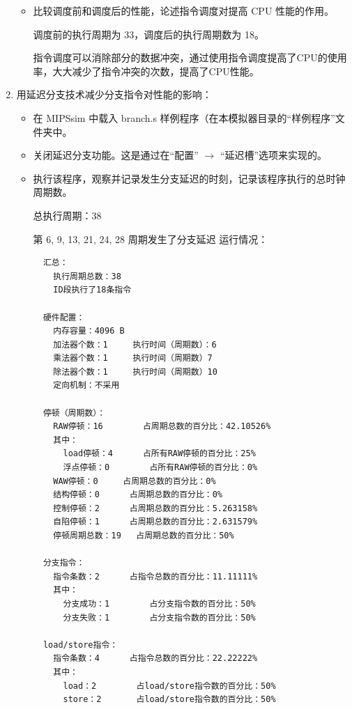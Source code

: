 \documentclass[blue,normal,cn]{elegantnote}
\begin{document}
\begin{enumerate}[wide=0pt, listparindent=2em, parsep=0pt]
\begin{itemize}[leftmargin=3em, listparindent=2em, parsep=0pt]
          \item 比较调度前和调度后的性能，论述指令调度对提高 CPU 性能的作用。

                \textcolor{ans}{调度前的执行周期为 33，调度后的执行周期数为 18。}

                \textcolor{ans}{指令调度可以消除部分的数据冲突，通过使用指令调度提高了CPU的使用率，大大减少了指令冲突的次数，提高了CPU性能。}


        \end{itemize}

  \item 用延迟分支技术减少分支指令对性能的影响：

        \begin{itemize}[leftmargin=3em, listparindent=2em, parsep=0pt]
          \item 在 MIPSsim 中载入 branch.s 样例程序（在本模拟器目录的“样例程序”文件夹中。
          \item 关闭延迟分支功能。这是通过在“配置” $\rightarrow$ “延迟槽”选项来实现的。
          \item 执行该程序，观察并记录发生分支延迟的时刻，记录该程序执行的总时钟周期数。

                \textcolor{ans}{总执行周期：38}

                \textcolor{ans}{第 6, 9, 13, 21, 24, 28 周期发生了分支延迟}
                \textcolor{ans}{运行情况：}
                \begin{lstlisting}
  汇总：
    执行周期总数：38
    ID段执行了18条指令

  硬件配置：
    内存容量：4096 B
    加法器个数：1		执行时间（周期数）：6
    乘法器个数：1		执行时间（周期数）7		
    除法器个数：1		执行时间（周期数）10		
    定向机制：不采用

  停顿（周期数）：
    RAW停顿：16		占周期总数的百分比：42.10526%
    其中：
      load停顿：4		占所有RAW停顿的百分比：25%
      浮点停顿：0		占所有RAW停顿的百分比：0%
    WAW停顿：0		占周期总数的百分比：0%
    结构停顿：0		占周期总数的百分比：0%
    控制停顿：2		占周期总数的百分比：5.263158%
    自陷停顿：1		占周期总数的百分比：2.631579%
    停顿周期总数：19	占周期总数的百分比：50%

  分支指令：
    指令条数：2		占指令总数的百分比：11.11111%
    其中：
      分支成功：1		占分支指令数的百分比：50%
      分支失败：1		占分支指令数的百分比：50%

  load/store指令：
    指令条数：4		占指令总数的百分比：22.22222%
    其中：
      load：2		占load/store指令数的百分比：50%
      store：2		占load/store指令数的百分比：50%


\end{lstlisting}
\end{itemize}
\end{enumerate}
\end{document}
